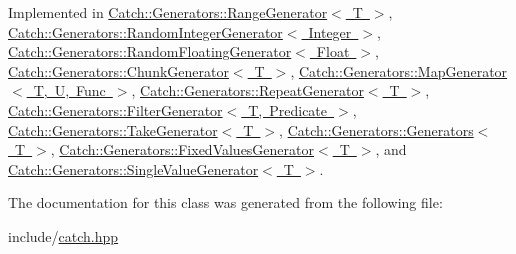 Implemented in \mbox{\hyperlink{class_catch_1_1_generators_1_1_range_generator_a4e6b2038832f09724d5a4355b4691259}{Catch\+::\+Generators\+::\+Range\+Generator$<$ T $>$}}, \mbox{\hyperlink{class_catch_1_1_generators_1_1_random_integer_generator_aaa3db70fbdfa3e8dcb61fb5592eba81f}{Catch\+::\+Generators\+::\+Random\+Integer\+Generator$<$ Integer $>$}}, \mbox{\hyperlink{class_catch_1_1_generators_1_1_random_floating_generator_a6a65e5f16abd884f58c31581b2a0d6db}{Catch\+::\+Generators\+::\+Random\+Floating\+Generator$<$ Float $>$}}, \mbox{\hyperlink{class_catch_1_1_generators_1_1_chunk_generator_a545e89f80eb1e3c953491541ea083f86}{Catch\+::\+Generators\+::\+Chunk\+Generator$<$ T $>$}}, \mbox{\hyperlink{class_catch_1_1_generators_1_1_map_generator_aa07e2f12d38ae060c30cc30d9dc236c5}{Catch\+::\+Generators\+::\+Map\+Generator$<$ T, U, Func $>$}}, \mbox{\hyperlink{class_catch_1_1_generators_1_1_repeat_generator_a24d5c2b1c09d6d220d4bd4c83f222dcb}{Catch\+::\+Generators\+::\+Repeat\+Generator$<$ T $>$}}, \mbox{\hyperlink{class_catch_1_1_generators_1_1_filter_generator_a02ce0839dcaa7545c55d0fe70cc50e84}{Catch\+::\+Generators\+::\+Filter\+Generator$<$ T, Predicate $>$}}, \mbox{\hyperlink{class_catch_1_1_generators_1_1_take_generator_ae343f3e28fe04e0a20d6fdf69bfb4c78}{Catch\+::\+Generators\+::\+Take\+Generator$<$ T $>$}}, \mbox{\hyperlink{class_catch_1_1_generators_1_1_generators_ad127fd2a07347b527f79ab3b78bd40fb}{Catch\+::\+Generators\+::\+Generators$<$ T $>$}}, \mbox{\hyperlink{class_catch_1_1_generators_1_1_fixed_values_generator_a6ce9e3ed045239c7b82873f24bd9cd3b}{Catch\+::\+Generators\+::\+Fixed\+Values\+Generator$<$ T $>$}}, and \mbox{\hyperlink{class_catch_1_1_generators_1_1_single_value_generator_a10833b34e3ccbc484624185712eb8b6e}{Catch\+::\+Generators\+::\+Single\+Value\+Generator$<$ T $>$}}.



The documentation for this class was generated from the following file\+:\begin{DoxyCompactItemize}
\item 
include/\mbox{\hyperlink{catch_8hpp}{catch.\+hpp}}\end{DoxyCompactItemize}
